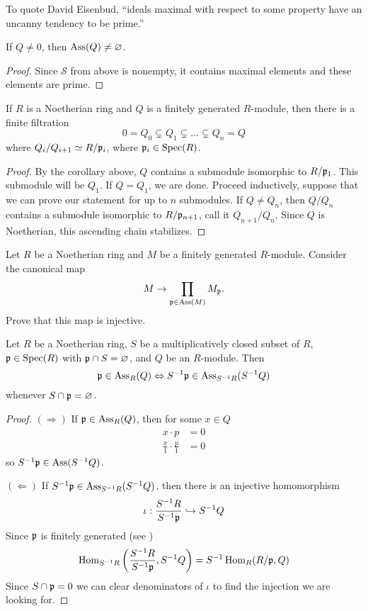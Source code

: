 \documentclass{ximera}
\begin{document}
To quote David Eisenbud, ``ideals maximal with respect to some
property have an uncanny tendency to be prime.''


\begin{corollary}
  If $Q\ne 0$, then $\operatorname{Ass}(Q) \ne \varnothing$.
  \begin{proof}
    Since $\mathcal{S}$ from above is nonempty, it contains maximal
    elements and these elements are prime.
  \end{proof}
\end{corollary}

\begin{corollary}
  If $R$ is a Noetherian ring and $Q$ is a finitely generated
  $R$-module, then there is a finite filtration
  \[
  0 = Q_0 \subsetneq Q_1 \subsetneq \dots \subsetneq Q_n = Q 
  \]
  where $Q_i/Q_{i+1} \simeq R/\mathfrak{p}_i$, where $\mathfrak{p}_i\in\operatorname{Spec}(R)$.
  \begin{proof}
    By the corollary above, $Q$ contains a submodule isomorphic to
    $R/\mathfrak{p}_1$. This submodule will be $Q_1$. If $Q = Q_1$, we are
    done. Proceed inductively, suppose that we can prove our statement
    for up to $n$ submodules. If $Q \ne Q_n$, then $Q/Q_n$ contains a
    submodule isomorphic to $R/\mathfrak{p}_{n+1}$, call it $Q_{n+1}/Q_n$. Since
    $Q$ is Noetherian, this ascending chain stabilizes.
  \end{proof}
\end{corollary}

\begin{exercise}
  Let $R$ be a Noetherian ring and $M$ be a finitely generated $R$-module. Consider the canonical map
  \[
  M\to \prod_{\mathfrak{p}\in\operatorname{Ass}(M)} M_{\mathfrak{p}}.
  \]
  Prove that this map is injective.
\end{exercise}



\begin{proposition}\label{P:assassinlocal}
  Let $R$ be a Noetherian ring, $S$ be a multiplicatively closed
  subset of $R$, $\mathfrak{p}\in\operatorname{Spec}(R)$ with $\mathfrak{p}\cap S = \varnothing$, and $Q$
  be an $R$-module. Then
  \[
  \mathfrak{p} \in \operatorname{Ass}_R(Q) \Leftrightarrow S^{-1}\mathfrak{p}\in \operatorname{Ass}_{S^{-1}R}(S^{-1}Q)
  \]
  whenever $S\cap\mathfrak{p} = \varnothing$.
  \begin{proof}
    $(\Rightarrow)$ If $\mathfrak{p}\in\operatorname{Ass}_R(Q)$, then for some $x\in Q$
    \begin{align*}
    x\cdot p &= 0\\
    \frac{x}{1} \cdot \frac{p}{1} &= 0
    \end{align*}
    so $S^{-1} \mathfrak{p}\in \operatorname{Ass}(S^{-1}Q)$.

    $(\Leftarrow)$ If $S^{-1}\mathfrak{p}\in \operatorname{Ass}_{S^{-1}R}(S^{-1}Q)$, then
    there is an injective homomorphism
    \[
    \iota:\frac{S^{-1}R}{S^{-1}\mathfrak{p}}\hookrightarrow S^{-1}Q
    \]
    Since $\mathfrak{p}$ is finitely generated (see \cite[Proposition 2.10]{dE1995})
    \[
    \operatorname{Hom}_{S^{-1}R}\left(\frac{S^{-1}R}{S^{-1}\mathfrak{p}},S^{-1}Q\right) = S^{-1}\operatorname{Hom}_{R}(R/\mathfrak{p},Q)
    \]
    Since $S\cap\mathfrak{p}=0$ we can clear denominators of $\iota$ to find the
    injection we are looking for.
  \end{proof}
\end{proposition}
\end{document}
